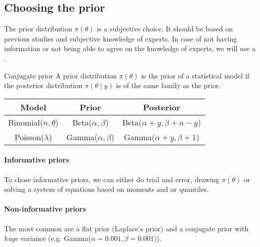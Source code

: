 \subsection{Choosing the prior}

The prior distribution $\pi(\theta)$ is a subjective choice. It should be based on previous
studies and subjective knowledge of experts. In case of not having information or
not being able to agree on the knowledge of experts, we will use a .

\begin{definition}{Conjugate prior}{}
    A prior distribution $\pi(\theta)$ is the  prior of a statistical model
    if the posterior distribution $\pi(\theta \mid y)$ is of the same family as the prior.

    \begin{ex}
        \begin{center}
        \begin{tabular}{ccc}
            \toprule
            Model & Prior & Posterior \\
            \midrule
            Binomial($n,\theta$) & Beta($\alpha,\beta$) & Beta($\alpha + y,\beta + n - y$) \\
            Poisson($\lambda$) & Gamma($\alpha,\beta$) & Gamma($\alpha + y,\beta + 1$) \\
            \bottomrule
        \end{tabular}
    \end{center}
    \end{ex}

\end{definition}

\paragraph{Informative priors}
To chose informative priors, we can either do trial and error, drawing
$\pi(\theta)$ or solving a system of equations based on moments and or quantiles.

\paragraph{Non-informative priors}
The most common are a flat prior (Laplace's prior) and a conjugate prior with
\emph{huge} variance (e.g. Gamma($\alpha=0.001,\beta=0.001$)).
